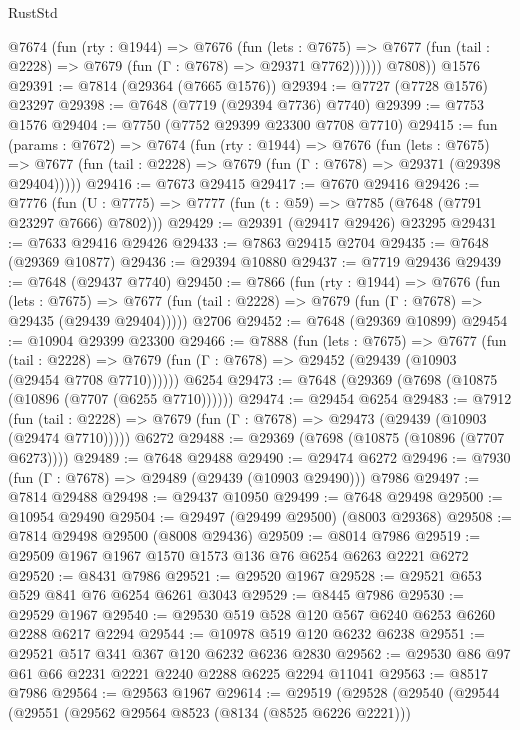 \begin{lexlean}{RustStd}
\begin{coremodule}
          @7674
            (fun (rty : @1944) =>
            @7676
              (fun (lets : @7675) =>
              @7677 (fun (tail : @2228) => @7679 (fun (Γ : @7678) => @29371 @7762))))))
        @7808))
    @1576
@29391 := @7814 (@29364 (@7665 @1576))
@29394 := @7727 (@7728 @1576) @23297
@29398 := @7648 (@7719 (@29394 @7736) @7740)
@29399 := @7753 @1576
@29404 := @7750 (@7752 @29399 @23300 @7708 @7710)
@29415 := fun (params : @7672) =>
  @7674
    (fun (rty : @1944) =>
    @7676
      (fun (lets : @7675) =>
      @7677 (fun (tail : @2228) => @7679 (fun (Γ : @7678) => @29371 (@29398 @29404)))))
@29416 := @7673 @29415
@29417 := @7670 @29416
@29426 := @7776
    (fun (U : @7775) => @7777 (fun (t : @59) => @7785 (@7648 (@7791 @23297 @7666) @7802)))
@29429 := @29391 (@29417 @29426) @23295
@29431 := @7633 @29416 @29426
@29433 := @7863 @29415 @2704
@29435 := @7648 (@29369 @10877)
@29436 := @29394 @10880
@29437 := @7719 @29436
@29439 := @7648 (@29437 @7740)
@29450 := @7866
    (fun (rty : @1944) =>
    @7676
      (fun (lets : @7675) =>
      @7677 (fun (tail : @2228) => @7679 (fun (Γ : @7678) => @29435 (@29439 @29404)))))
    @2706
@29452 := @7648 (@29369 @10899)
@29454 := @10904 @29399 @23300
@29466 := @7888
    (fun (lets : @7675) =>
    @7677
      (fun (tail : @2228) =>
      @7679 (fun (Γ : @7678) => @29452 (@29439 (@10903 (@29454 @7708 @7710))))))
    @6254
@29473 := @7648 (@29369 (@7698 (@10875 (@10896 (@7707 (@6255 @7710))))))
@29474 := @29454 @6254
@29483 := @7912
    (fun (tail : @2228) => @7679 (fun (Γ : @7678) => @29473 (@29439 (@10903 (@29474 @7710)))))
    @6272
@29488 := @29369 (@7698 (@10875 (@10896 (@7707 @6273))))
@29489 := @7648 @29488
@29490 := @29474 @6272
@29496 := @7930 (fun (Γ : @7678) => @29489 (@29439 (@10903 @29490))) @7986
@29497 := @7814 @29488
@29498 := @29437 @10950
@29499 := @7648 @29498
@29500 := @10954 @29490
@29504 := @29497 (@29499 @29500) (@8003 @29368)
@29508 := @7814 @29498 @29500 (@8008 @29436)
@29509 := @8014 @7986
@29519 := @29509 @1967 @1967 @1570 @1573 @136 @76 @6254 @6263 @2221 @6272
@29520 := @8431 @7986
@29521 := @29520 @1967
@29528 := @29521 @653 @529 @841 @76 @6254 @6261 @3043
@29529 := @8445 @7986
@29530 := @29529 @1967
@29540 := @29530 @519 @528 @120 @567 @6240 @6253 @6260 @2288 @6217 @2294
@29544 := @10978 @519 @120 @6232 @6238
@29551 := @29521 @517 @341 @367 @120 @6232 @6236 @2830
@29562 := @29530 @86 @97 @61 @66 @2231 @2221 @2240 @2288 @6225 @2294 @11041
@29563 := @8517 @7986
@29564 := @29563 @1967
@29614 := @29519
    (@29528
      (@29540
        (@29544
          (@29551
            (@29562 @29564 @8523 (@8134 (@8525 @6226 @2221)))

\end{coremodule}
\end{lexlean}

